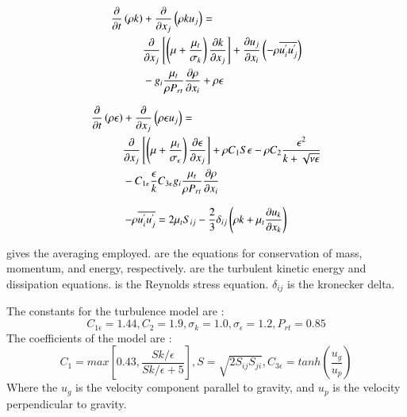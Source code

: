\documentclass[preprint,12pt]{elsarticle}
\begin{document}
\begin{equation}
\centering
\begin{split}
\frac{\partial }{\partial t} \left(\rho k \right) &+ \frac{\partial }{\partial x_j} \left( \rho k u_j \right) = \\
&\frac{\partial }{\partial x_j} \left[ \left( \mu + \frac{\mu_t}{\sigma_k} \right) \frac{\partial k}{\partial x_j} \right] + \frac{\partial u_j}{\partial x_i} \left( -\rho \overline{u^{'}_{i} u^{'}_{j}} \right) \\
&- g_i \frac{\mu_t}{\rho P_{rt}} \frac{\partial \rho }{\partial x_i} + \rho \epsilon
\label{eq:k}
\end{split}
\end{equation}

\begin{equation}
\centering
\begin{split}
 \frac{\partial }{\partial t} \left(\rho \epsilon \right) &+ \frac{\partial }{\partial x_j} \left( \rho \epsilon u_j \right) = \\
 &\frac{\partial }{\partial x_j } \left[ \left( \mu + \frac{\mu_t }{\sigma_\epsilon } \right) \frac{\partial \epsilon }{\partial x_j } \right] + \rho C_1 S \epsilon - \rho C_2 \frac{\epsilon^2 }{k+\sqrt{\nu \epsilon}} \\
 &- C_{1 \epsilon} \frac{\epsilon}{k} C_{3\epsilon} g_i \frac{\mu_t}{\rho P_{rt}} \frac{\partial \rho}{\partial x_i}
\label{eq:e}
\end{split}
\end{equation}

\begin{equation}
\centering
- \rho \overline{u^{'}_{i} u^{'}_{j}} = 2\mu_t S_{ij} - \frac{2}{3} \delta_{ij} \left( \rho k + \mu_t \frac{\partial u_k}{\partial x_k} \right)
\label{eq:reynoldsstress}
\end{equation}

 gives the averaging employed.   are the equations for conservation of mass, momentum, and energy, respectively.   are the turbulent kinetic energy and dissipation equations.   is the Reynolds stress equation.  $\delta_{ij}$ is the kronecker delta.

The constants for the turbulence model are \cite{realizable} : 
\begin{equation}
\label{eq:constants}
C_{1\epsilon} = 1.44 , C_2 = 1.9 , \sigma_k = 1.0 , \sigma_\epsilon = 1.2 , P_{rt} = 0.85 
\end{equation}
%
The coefficients of the model are \cite{fluent}:
\begin{equation}
C_1 = max\left[0.43,\frac{Sk/\epsilon}{Sk/\epsilon +5} \right] , S = \sqrt{2S_{ij}S_{ji}} , C_{3\epsilon} = tanh\left(\frac{u_g}{u_p}\right)
\end{equation}
%
Where the $u_g$ is the velocity component parallel to gravity, and $u_p$ is the velocity perpendicular to gravity.  
\end{document}
